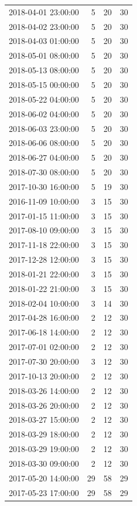 \begin{tabular}{lrrr}
2018-04-01 23:00:00 & 5 & 20 & 30 \\
2018-04-02 23:00:00 & 5 & 20 & 30 \\
2018-04-03 01:00:00 & 5 & 20 & 30 \\
2018-05-01 08:00:00 & 5 & 20 & 30 \\
2018-05-13 08:00:00 & 5 & 20 & 30 \\
2018-05-15 00:00:00 & 5 & 20 & 30 \\
2018-05-22 04:00:00 & 5 & 20 & 30 \\
2018-06-02 04:00:00 & 5 & 20 & 30 \\
2018-06-03 23:00:00 & 5 & 20 & 30 \\
2018-06-06 08:00:00 & 5 & 20 & 30 \\
2018-06-27 04:00:00 & 5 & 20 & 30 \\
2018-07-30 08:00:00 & 5 & 20 & 30 \\
2017-10-30 16:00:00 & 5 & 19 & 30 \\
2016-11-09 10:00:00 & 3 & 15 & 30 \\
2017-01-15 11:00:00 & 3 & 15 & 30 \\
2017-08-10 09:00:00 & 3 & 15 & 30 \\
2017-11-18 22:00:00 & 3 & 15 & 30 \\
2017-12-28 12:00:00 & 3 & 15 & 30 \\
2018-01-21 22:00:00 & 3 & 15 & 30 \\
2018-01-22 21:00:00 & 3 & 15 & 30 \\
2018-02-04 10:00:00 & 3 & 14 & 30 \\
2017-04-28 16:00:00 & 2 & 12 & 30 \\
2017-06-18 14:00:00 & 2 & 12 & 30 \\
2017-07-01 02:00:00 & 2 & 12 & 30 \\
2017-07-30 20:00:00 & 3 & 12 & 30 \\
2017-10-13 20:00:00 & 2 & 12 & 30 \\
2018-03-26 14:00:00 & 2 & 12 & 30 \\
2018-03-26 20:00:00 & 2 & 12 & 30 \\
2018-03-27 15:00:00 & 2 & 12 & 30 \\
2018-03-29 18:00:00 & 2 & 12 & 30 \\
2018-03-29 19:00:00 & 2 & 12 & 30 \\
2018-03-30 09:00:00 & 2 & 12 & 30 \\
2017-05-20 14:00:00 & 29 & 58 & 29 \\
2017-05-23 17:00:00 & 29 & 58 & 29 \\

\end{tabular}
